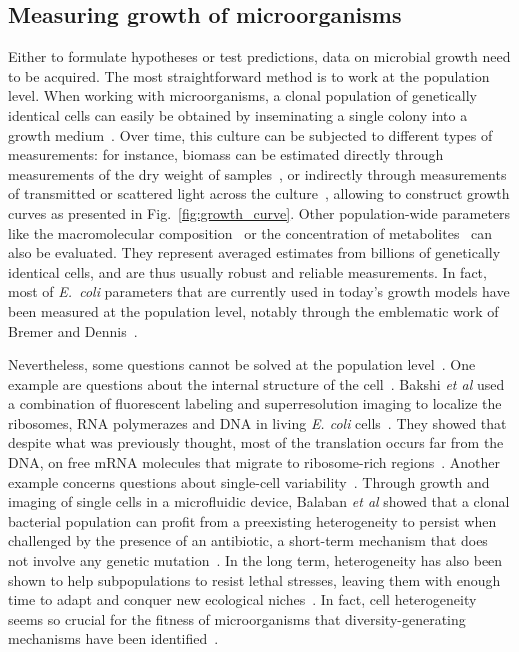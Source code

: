 \subsection{Measuring growth of microorganisms}

Either to formulate hypotheses or test predictions, data on microbial growth need to be acquired.
The most straightforward method is to work at the population level.
When working with microorganisms, a clonal population of genetically identical cells can easily be obtained by inseminating a single colony into a growth medium~\cite{schaechter_microbe_2006}.
Over time, this culture can be subjected to different types of measurements: for instance, biomass can be estimated  directly through measurements of the dry weight of samples~\cite{monod_growth_1949}, or indirectly through measurements of transmitted or scattered light across the culture~\cite{volkmer_condition-dependent_2011}, allowing to construct growth curves as presented in Fig.~\ref{fig:growth_curve}.
Other population-wide parameters like the macromolecular composition~\cite{scott_interdependence_2010,scott_bacterial_2011} or the concentration of metabolites~\cite{bennett_absolute_2009} can also be evaluated.
They represent averaged estimates from billions of genetically identical cells, and are thus usually robust and reliable measurements.
In fact, most of \textit{E.~coli} parameters that are currently used in today's growth models have been measured at the population level, notably through the emblematic work of Bremer and Dennis~\cite{churchward_macromolecular_1982,bremer_modulation_1996,bremer_free_2003,bremer_feedback_2008}.

Nevertheless, some questions cannot be solved at the population level~\cite{davey_flow_1996,bakshi_superresolution_2012,balaban_bacterial_2004}.
One example are questions about the internal structure of the cell~\cite{bakshi_superresolution_2012}.
Bakshi \textit{et al} used a combination of fluorescent labeling and superresolution imaging to localize the ribosomes, RNA polymerazes and DNA in living \textit{E. coli} cells~\cite{bakshi_superresolution_2012}.
They showed that despite what was previously thought, most of the translation occurs far from the DNA, on free mRNA molecules that migrate to ribosome-rich regions~\cite{bakshi_superresolution_2012}.
Another example concerns questions about single-cell variability~\cite{balaban_bacterial_2004,booth_stress_2002,sumner_phenotypic_2002}.
Through growth and imaging of single cells in a microfluidic device, Balaban \textit{et al} showed that a clonal bacterial population can profit from a preexisting heterogeneity to persist when challenged by the presence of an antibiotic, a short-term mechanism that does not involve any genetic mutation~\cite{balaban_bacterial_2004}.
In the long term, heterogeneity has also been shown to help subpopulations to resist lethal stresses, leaving them with enough time to adapt and conquer new ecological niches~\cite{booth_stress_2002,sumner_phenotypic_2002}.
In fact, cell heterogeneity seems so crucial for the fitness of microorganisms that diversity-generating mechanisms have been identified~\cite{true_yeast_2000,fraser_noise_2004,raser_control_2004}.

